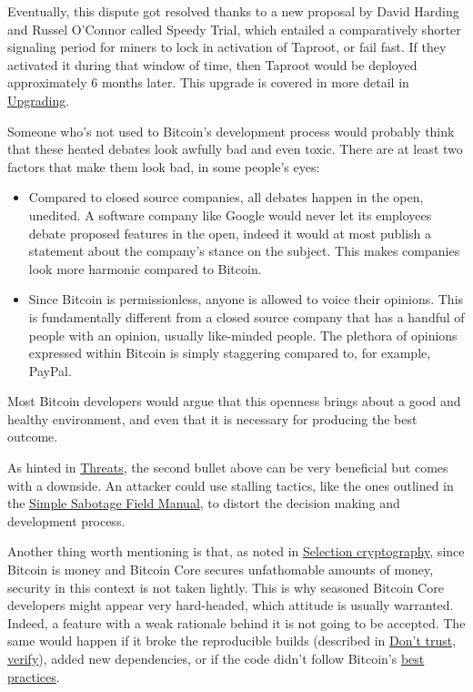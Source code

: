 Eventually, this dispute got resolved thanks to a new proposal by David
Harding and Russel O'Connor called Speedy Trial, which entailed a
comparatively shorter signaling period for miners to lock in activation
of Taproot, or fail fast. If they activated it during that window of
time, then Taproot would be deployed approximately 6 months later. This
upgrade is covered in more detail in
\protect\hyperlink{upgrading}{Upgrading}.

Someone who's not used to Bitcoin's development process would probably
think that these heated debates look awfully bad and even toxic. There
are at least two factors that make them look bad, in some people's eyes:

\begin{itemize}
\item
  Compared to closed source companies, all debates happen in the open,
  unedited. A software company like Google would never let its employees
  debate proposed features in the open, indeed it would at most publish
  a statement about the company's stance on the subject. This makes
  companies look more harmonic compared to Bitcoin.
\item
  Since Bitcoin is permissionless, anyone is allowed to voice their
  opinions. This is fundamentally different from a closed source company
  that has a handful of people with an opinion, usually like-minded
  people. The plethora of opinions expressed within Bitcoin is simply
  staggering compared to, for example, PayPal.
\end{itemize}

Most Bitcoin developers would argue that this openness brings about a
good and healthy environment, and even that it is necessary for
producing the best outcome.

As hinted in \protect\hyperlink{threats}{Threats}, the second bullet
above can be very beneficial but comes with a downside. An attacker
could use stalling tactics, like the ones outlined in the
\href{https://www.gutenberg.org/ebooks/26184}{Simple Sabotage Field
Manual}, to distort the decision making and development process.

Another thing worth mentioning is that, as noted in
\protect\hyperlink{selectioncryptography}{Selection cryptography}, since
Bitcoin is money and Bitcoin Core secures unfathomable amounts of money,
security in this context is not taken lightly. This is why seasoned
Bitcoin Core developers might appear very hard-headed, which attitude is
usually warranted. Indeed, a feature with a weak rationale behind it is
not going to be accepted. The same would happen if it broke the
reproducible builds (described in
\protect\hyperlink{donttrustverify}{Don't trust, verify}), added new
dependencies, or if the code didn't follow Bitcoin's
\href{https://github.com/bitcoin/bitcoin/blob/master/doc/developer-notes.md}{best
practices}.

